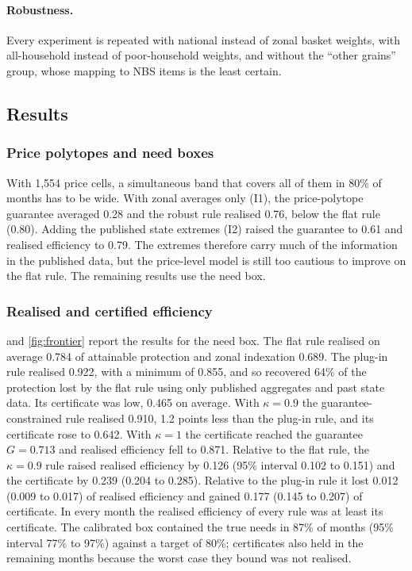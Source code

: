 \documentclass[preprint,12pt,number]{elsarticle}%
\theoremstyle{definition}
\theoremstyle{remark}
\begin{document}
\paragraph{Robustness.} Every experiment is repeated with national instead of zonal basket weights, with all-household instead of poor-household weights, and without the ``other grains'' group, whose mapping to NBS items is the least certain.

\subsection{Results}\label{sec:results}

\subsubsection{Price polytopes and need boxes}

With 1{,}554 price cells, a simultaneous band that covers all of them in 80\% of months has to be wide. With zonal averages only (I1), the price-polytope guarantee averaged 0.28 and the robust rule realised 0.76, below the flat rule (0.80). Adding the published state extremes (I2) raised the guarantee to 0.61 and realised efficiency to 0.79. The extremes therefore carry much of the information in the published data, but the price-level model is still too cautious to improve on the flat rule. The remaining results use the need box.

\subsubsection{Realised and certified efficiency}

 and \cref{fig:frontier} report the results for the need box. The flat rule realised on average 0.784 of attainable protection and zonal indexation 0.689. The plug-in rule realised 0.922, with a minimum of 0.855, and so recovered 64\% of the protection lost by the flat rule using only published aggregates and past state data. Its certificate was low, 0.465 on average. With $\kappa=0.9$ the guarantee-constrained rule realised 0.910, 1.2 points less than the plug-in rule, and its certificate rose to 0.642. With $\kappa=1$ the certificate reached the guarantee $G=0.713$ and realised efficiency fell to 0.871. Relative to the flat rule, the $\kappa=0.9$ rule raised realised efficiency by 0.126 (95\% interval 0.102 to 0.151) and the certificate by 0.239 (0.204 to 0.285). Relative to the plug-in rule it lost 0.012 (0.009 to 0.017) of realised efficiency and gained 0.177 (0.145 to 0.207) of certificate. In every month the realised efficiency of every rule was at least its certificate. The calibrated box contained the true needs in 87\% of months (95\% interval 77\% to 97\%) against a target of 80\%; certificates also held in the remaining months because the worst case they bound was not realised.
\end{document}
